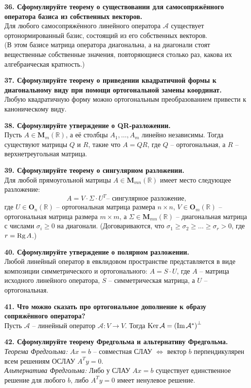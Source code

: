 \documentclass[11pt,a4paper]{article}
\newcommand{\R}{\mathbb{R}}
\newcommand{\A}{\mathcal{A}}
\newcommand{\Rg}[1]{\mathrm{Rg}\hspace{0.5mm}#1}
\newcommand{\Ker}[1]{\mathrm{Ker}\hspace{0.5mm}#1}
\renewcommand{\Im}[1]{\mathrm{Im}\hspace{0.5mm}#1}
\begin{document}
\textbf{36. Сформулируйте теорему о существовании для самосопряжённого оператора базиса из собственных векторов.\\}
Для любого самосопряжённого линейного оператора $\A$ существует ортонормированный базис, состоящий из его собственных векторов.\\
(В этом базисе матрица оператора диагональна, а на диагонали стоят вещественные собственные значения, повторяющиеся столько раз, какова их алгебраическая кратность.)\pagebreak

\textbf{37. Сформулируйте теорему о приведении квадратичной формы к диагональному виду при помощи ортогональной замены координат.\\}
Любую квадратичную форму можно ортогональным преобразованием привести к каноническому виду.

\textbf{38. Сформулируйте утверждение о QR-разложении.\\}
Пусть $A \in \mathbf{M}_m (\R)$, а её столбцы $A_1, \hdots, A_m$ линейно независимы. Тогда существуют матрицы $Q$ и $R$, такие что $A = QR$, где $Q$ -- ортогональная, а $R$ -- верхнетреугольная матрица. 

\textbf{39. Сформулируйте теорему о сингулярном разложении.\\}
Для любой прямоугольной матрицы $A \in \mathbf{M}_{mn} (\R)$ имеет место следующее разложение:
$$A = V \cdot \Sigma \cdot U^T \text{-- сингулярное разложение},$$
где $U \in \mathbf{O}_n (\R)$ -- ортогональная матрица размера $n \times n$, $V \in \mathbf{O}_m (\R)$ -- ортогональная матрица размера $m \times m$, а $\Sigma \in \mathbf{M}_{mn} (\R)$ -- диагональная матрица с числами $\sigma_i \geq 0$ на диагонали. (Договариваются, что $\sigma_1 \geq \sigma_2 \geq \hdots \geq \sigma_r > 0$, где $r = \Rg{A}$.)

\textbf{40. Сформулируйте утверждение о полярном разложении.\\}
Любой линейный оператор в евклидовом пространстве представляется в виде композиции симметрического и ортогонального: $A = S \cdot U$, где $A$ -- матрица исходного линейного оператора, $S$ -- симметрическая матрица, а $U$ -- ортогональная.

\textbf{41. Что можно сказать про ортогональное дополнение к образу сопряжённого оператора?\\}
Пусть $\A$ -- линейный оператор $\A : V \rightarrow V$. Тогда $\Ker{\A} = \left( \Im{\A^*} \right)^\perp$

\textbf{42. Сформулируйте теорему Фредгольма и альтернативу Фредгольма.\\}
\textit{Теорема Фредгольма:} $Ax = b$ -- совместная СЛАУ $\Leftrightarrow$ вектор $b$ перпендикулярен всем решениям ОСЛАУ $A^T y = 0$.\\
\textit{Альтернатива Фредгольма:} Либо у СЛАУ $Ax = b$ существует единственное решение для любого $b$, либо $A^T y = 0$ имеет ненулевое решение.
\end{document}
